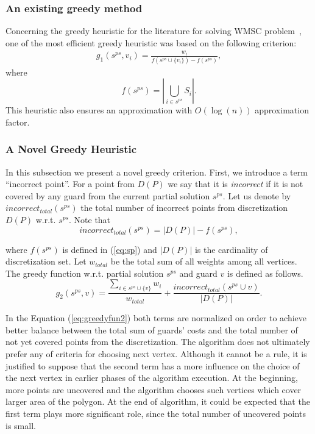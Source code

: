 \documentclass[runningheads,a4paper]{elsarticle}
\begin{document}
	\subsubsection{An existing greedy method}
	
	Concerning the greedy heuristic for the literature for solving WMSC problem~\cite{chvatal1979greedy, lovasz1975ratio}, one of the most efficient greedy heuristic was based on the following criterion:
	\begin{align}\label{eq:Lovasz}
	g_1(s^{ps}, v_i) = \frac{w_{i}}{ f(s^{ps} \cup \{v_i\})  - f(s^{ps})},
	\end{align}
	where
\begin{equation}\label{eq:sp}
    f(s^{ps}) = \left|\bigcup_{i \in s^{ps}} S_i \right|.
    \end{equation}
	This heuristic  also ensures an approximation with $O(\log(n))$ approximation factor.
	
	\subsubsection{A Novel Greedy Heuristic}
	In this subsection we present a novel greedy criterion. First, we introduce a term  ``incorrect point''. For a point from $D(P)$ we say that it is \textit{incorrect} if it is not covered by any guard from the current partial solution $s^{ps}$. Let us denote by $incorrect_{total}(s^{ps})$ the total number of incorrect points from discretization $D(P)$ w.r.t. $s^{ps}$. Note that 
 \begin{equation}\label{eq:incorrect}
 incorrect_{total}(s^{ps}) = |D(P)|-f(s^{ps}),
 \end{equation}
 
 where $f(s^{ps})$ is defined in (\ref{eq:sp}) and $|D(P)|$ is the cardinality of discretization set. Let $w_{total}$ be the total sum of all weights among all vertices. The greedy function w.r.t. partial solution $s^{ps}$ and  guard $v$ is defined as follows.
	\begin{equation}\label{eq:greedyfun2}
    g_2(s^{ps}, v)  =    \frac{\sum_{i \in s^{ps} \cup \{v\}} w_i}{w_{total}}+ \frac{incorrect_{total}(s^{ps}\cup v)}{|D(P)|}.
	\end{equation}

	In the Equation  (\ref{eq:greedyfun2}) both terms are normalized on order to achieve better balance between the total sum of guards' costs and the total number of not yet covered points from the discretization. The algorithm does not  ultimately prefer any of criteria for choosing next vertex. Although it cannot be a rule, it is justified to suppose that the second term has a more influence on the choice of the next vertex in earlier phases of the algorithm execution. At the beginning, more points are uncovered and the algorithm  chooses such vertices which cover larger area of the polygon. At the end of algorithm, it could be expected that the first term plays more significant role, since the total number of uncovered points is small.
	
\end{document}
